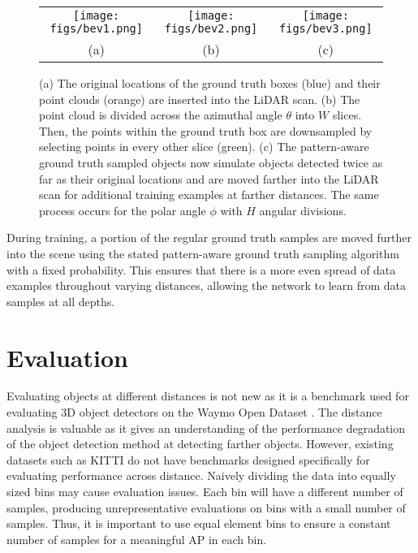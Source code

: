 \documentclass[10pt, conference, compsocconf]{IEEEtran}
\begin{document}
\begin{figure*}[ht!]
\centering
\begin{tabular}{ccc}
    \texttt{[image: figs/bev1.png]} &
    \texttt{[image: figs/bev2.png]} &
    \texttt{[image: figs/bev3.png]}\\
    (a) & (b) & (c)
\end{tabular}
\caption{(a) The original locations of the ground truth boxes (blue) and their point clouds (orange) are inserted into the LiDAR scan. (b) The point cloud is divided across the azimuthal angle $\theta$ into $W$ slices. Then, the points within the ground truth box are downsampled by selecting points in every other slice (green). (c) The pattern-aware ground truth sampled objects now simulate objects detected twice as far as their original locations and are moved farther into the LiDAR scan for additional training examples at farther distances. The same process occurs for the polar angle $\phi$ with $H$ angular divisions.}
\label{fig:bev}
\end{figure*}

During training, a portion of the regular ground truth samples are moved further into the scene using the stated pattern-aware ground truth sampling algorithm with a fixed probability. This ensures that there is a more even spread of data examples throughout varying distances, allowing the network to learn from data samples at all depths.

\section{Evaluation}
Evaluating objects at different distances is not new as it is a benchmark used for evaluating 3D object detectors on the Waymo Open Dataset \cite{Sun2020}. The distance analysis is valuable as it gives an understanding of the performance degradation of the object detection method at detecting farther objects. However, existing datasets such as KITTI do not have benchmarks designed specifically for evaluating performance across distance. Naively dividing the data into equally sized bins may cause evaluation issues. Each bin will have a different number of samples, producing unrepresentative evaluations on bins with a small number of samples. Thus, it is important to use equal element bins to ensure a constant number of samples for a meaningful AP in each bin.
\end{document}
